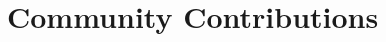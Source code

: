 \documentclass[]{resume-openfont}
\newcommand{\projectHeading}[3]{\Project{#1}{#2}
\descript{#3}\\}
\begin{document}



\sectionsep


\section{Community Contributions}
\end{document}
